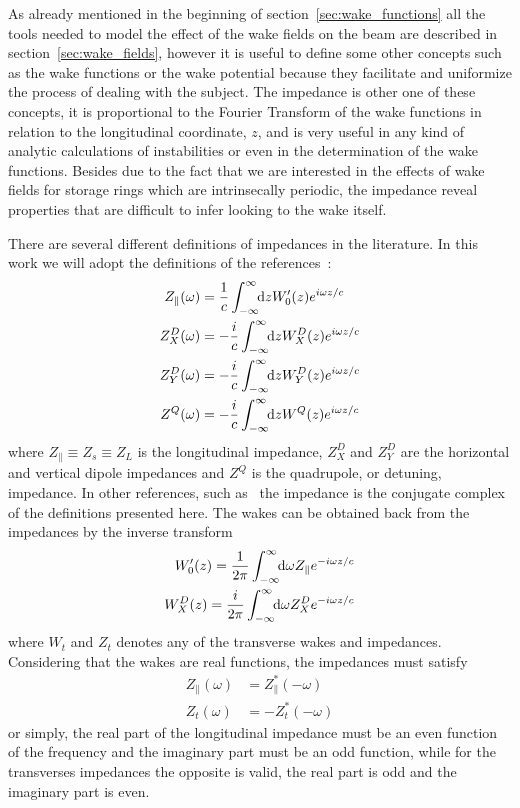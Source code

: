 \documentclass[
	12pt,				%
	openright,			%
	oneside,			%
	a4paper,		%
	chapter=TITLE,		%
	section=TITLE,		%
    brazil,				%
	english,			%
	sumario=tradicional,
	]{abntex2}
\begin{document}
  As already mentioned in the beginning of section~\ref{sec:wake_functions} all the tools needed to model the effect of the wake fields on the beam are described in section~\ref{sec:wake_fields}, however it is useful to define some other concepts such as the wake functions or the wake potential because they facilitate and uniformize the process of dealing with the subject. The impedance is other one of these concepts, it is proportional to the Fourier Transform of the wake functions in relation to the longitudinal coordinate, $z$, and is very useful in any kind of analytic calculations of instabilities or even in the determination of the wake functions. Besides due to the fact that we are interested in the effects of wake fields for storage rings which are intrinsecally periodic, the impedance reveal properties that are difficult to infer looking to the wake itself.

  There are several different definitions of impedances in the literature. In this work we will adopt the definitions of the references~\cite{CHao1993, Stupakov2000a, Heifets1991}:
  \begin{align}\label{eq:impedances_definition}
	  \nonumber
  	  Z_\parallel(\omega) &= \frac1c \infint{z}{W'_0(z)e^{i\omega z/c}}\\
  	  \nonumber
      Z^D_X(\omega) &= -\frac{i}{c} \infint{z}{W^D_X(z)e^{i\omega z/c}}\\
      Z^D_Y(\omega) &= -\frac{i}{c} \infint{z}{W^D_Y(z)e^{i\omega z/c}}\\
	  \nonumber
      Z^Q(\omega) &= -\frac{i}{c} \infint{z}{W^Q(z)e^{i\omega z/c}}
  \end{align}
  where $Z_\parallel \equiv Z_s \equiv Z_L$ is the longitudinal impedance, $Z^D_X$ and $Z^D_Y$ are the horizontal and vertical dipole impedances and $Z^Q$ is the quadrupole, or detuning, impedance. In other references, such as~\cite{Zotter1993, Wilson1987} the impedance is the conjugate complex of the definitions presented here. The wakes can be obtained back from the impedances by the inverse transform
  \begin{align}
	  \nonumber
  	  W'_0(z) = \frac{1}{2\pi}\int_{-\infty}^{\infty}\!\!\text{d}\omega Z_\parallel e^{-i\omega z/c}\\
	  W^D_X(z) = \frac{i}{2\pi}\int_{-\infty}^{\infty}\!\!\text{d}\omega Z^D_X e^{-i\omega z/c}
  \end{align}
  where $W_t$ and $Z_t$ denotes any of the transverse wakes and impedances. Considering that the wakes are real functions, the impedances must satisfy
  \begin{align}
  	  Z_\parallel(\omega) &= Z_\parallel^*(-\omega)\\
	  Z_t(\omega) &= -Z_t^*(-\omega)
  \end{align}
  or simply, the real part of the longitudinal impedance must be an even function of the frequency and the imaginary part must be an odd function, while for the transverses impedances the opposite is valid, the real part is odd and the imaginary part is even.
\end{document}
